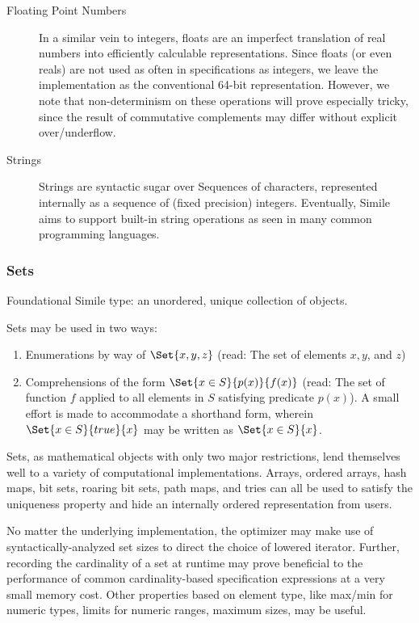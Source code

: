 \begin{description}
    \item[Floating Point Numbers] In a similar vein to integers, floats are an imperfect translation of real numbers into efficiently calculable representations. Since floats (or even reals) are not used as often in specifications as integers, we leave the implementation as the conventional 64-bit representation. However, we note that non-determinism on these operations will prove especially tricky, since the result of commutative complements may differ without explicit over/underflow.
    \item[Strings] Strings are syntactic sugar over Sequences of characters, represented internally as a sequence of (fixed precision) integers. Eventually, Simile aims to support built-in string operations as seen in many common programming languages.
\end{description}

\subsubsection{Sets}
Foundational Simile type: an unordered, unique collection of objects.

Sets may be used in two ways:
\begin{enumerate}
    \item Enumerations by way of $\Set{x,y,z}$ (read: The set of elements $x,y$, and $z$)
    \item Comprehensions of the form $\Set{x \in S}{p(x)}{f(x)}$ (read: The set of function $f$ applied to all elements in $S$ satisfying predicate $p(x)$). A small effort is made to accommodate a shorthand form, wherein $\Set{x \in S}{true}{x}$ may be written as $\Set{x \in S}{x}$.
\end{enumerate}

Sets, as mathematical objects with only two major restrictions, lend themselves well to a variety of computational implementations. Arrays, ordered arrays, hash maps, bit sets, roaring bit sets, path maps, and tries can all be used to satisfy the uniqueness property and hide an internally ordered representation from users.


No matter the underlying implementation, the optimizer may make use of syntactically-analyzed set sizes to direct the choice of lowered iterator. Further, recording the cardinality of a set at runtime may prove beneficial to the performance of common cardinality-based specification expressions at a very small memory cost. Other properties based on element type, like max/min for numeric types, limits for numeric ranges, maximum sizes, may be useful.


